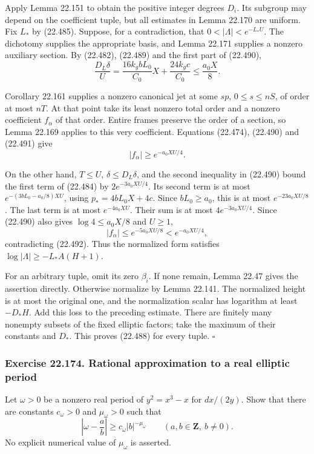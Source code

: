 \documentclass[
  11pt,
  a4paper,
]{article}
\newcounter{none} %
\begin{document}
Apply Lemma 22.151 to obtain the positive integer degrees \(D_i\). Its
subgroup may depend on the coefficient tuple, but all estimates in Lemma
22.170 are uniform. Fix \(L_*\) by (22.485). Suppose, for a
contradiction, that \(0<|\Lambda|<e^{-L_*U}\). The dichotomy supplies
the appropriate basis, and Lemma 22.171 supplies a nonzero auxiliary
section. By (22.482), (22.489) and the first part of (22.490), \[
 \frac{D_L\delta}{U}
   =\frac{16k_gbL_0}{C_0}X+\frac{24k_gc}{C_0}
   \le\frac{a_0X}{8}.
 \tag{22.491}
\]

Corollary 22.161 supplies a nonzero canonical jet at some \(sp\),
\(0\le s\le nS\), of order at most \(nT\). At that point take its least
nonzero total order and a nonzero coefficient \(f_\alpha\) of that
order. Entire frames preserve the order of a section, so Lemma 22.169
applies to this very coefficient. Equations (22.474), (22.490) and
(22.491) give \[
 |f_\alpha|\ge e^{-a_0XU/4}.
 \tag{22.492}
\]

On the other hand, \(T\le U\), \(\delta\le D_L\delta\), and the second
inequality in (22.490) bound the first term of (22.484) by
\(2e^{-3a_0XU/4}\). Its second term is at most \(e^{-(3bL_0-a_0/8)XU}\),
using \(p_*=4bL_0X+4c\). Since \(bL_0\ge a_0\), this is at most
\(e^{-23a_0XU/8}\). The last term is at most \(e^{-4a_0XU}\). Their sum
is at most \(4e^{-3a_0XU/4}\). Since (22.490) also gives
\(\log4\le a_0X/8\) and \(U\ge1\), \[
 |f_\alpha|\le e^{-5a_0XU/8}<e^{-a_0XU/4},
 \tag{22.493}
\] contradicting (22.492). Thus the normalized form satisfies
\(\log|\Lambda|\ge-L_*A(H+1)\).

For an arbitrary tuple, omit its zero \(\beta_i\). If none remain, Lemma
22.47 gives the assertion directly. Otherwise normalize by Lemma 22.141.
The normalized height is at most the original one, and the normalization
scalar has logarithm at least \(-D_*H\). Add this loss to the preceding
estimate. There are finitely many nonempty subsets of the fixed elliptic
factors; take the maximum of their constants and \(D_*\). This proves
(22.488) for every tuple. \(\square\)

\subsubsection{Exercise 22.174. Rational approximation to a real
elliptic
period}\label{exercise-22.174.-rational-approximation-to-a-real-elliptic-period}

Let \(\omega>0\) be a nonzero real period of \(y^2=x^3-x\) for
\(dx/(2y)\). Show that there are constants \(c_\omega>0\) and
\(\mu_\omega>0\) such that \[
 \left|\omega-\frac ab\right|
       \ge c_\omega |b|^{-\mu_\omega}
       \qquad(a,b\in\mathbf Z,\ b\ne0).
 \tag{22.494}
\] No explicit numerical value of \(\mu_\omega\) is asserted.
\end{document}
